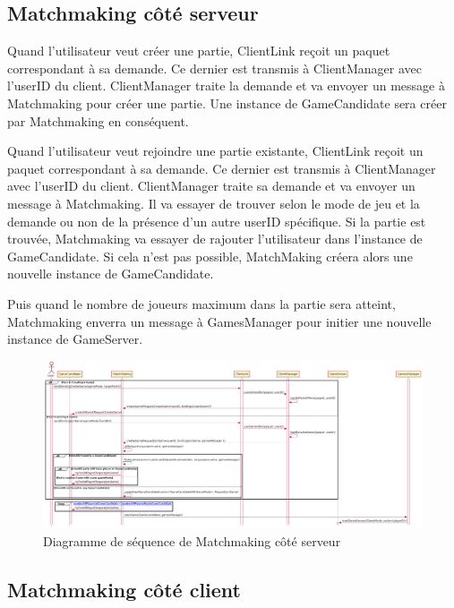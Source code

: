 \documentclass{article}
\begin{document}
\subsection{Matchmaking côté serveur}

Quand l'utilisateur veut créer une partie, ClientLink reçoit un paquet correspondant à sa demande. Ce dernier est transmis à ClientManager avec l'userID du client. ClientManager traite la demande et va envoyer un message à Matchmaking pour créer une partie. Une instance de GameCandidate sera créer par Matchmaking en conséquent. 

Quand l'utilisateur veut rejoindre une partie existante, ClientLink reçoit un paquet correspondant à sa demande. Ce dernier est transmis à ClientManager avec l'userID du client. ClientManager traite sa demande et va envoyer un message à Matchmaking. Il va essayer de trouver selon le mode de jeu et la demande ou non de la présence d'un autre userID spécifique. Si la partie est trouvée, Matchmaking va essayer de rajouter l'utilisateur dans l'instance de GameCandidate. Si cela n'est pas possible, MatchMaking créera alors une nouvelle instance de GameCandidate. 

Puis quand le nombre de joueurs maximum dans la partie sera atteint, Matchmaking enverra un message à GamesManager pour initier une nouvelle instance de GameServer.

\begin{figure}[H]
    \centering
    \includegraphics[width=1\textwidth]{../res/uml/sequence/MatchMakingServerSequence.png}
    \caption{Diagramme de séquence de Matchmaking côté serveur}
    \label{fig:MatchmakingServerDiagram}
\end{figure}

\subsection{Matchmaking côté client}
\end{document}
